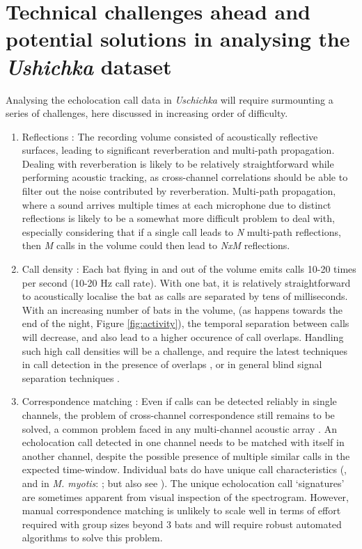 \documentclass[
]{book}
\begin{document}
\hypertarget{technical-challenges-ahead-and-potential-solutions-in-analysing-the-ushichka-dataset}{%
\section{\texorpdfstring{Technical challenges ahead and potential solutions in analysing the \emph{Ushichka} dataset}{Technical challenges ahead and potential solutions in analysing the Ushichka dataset}}\label{technical-challenges-ahead-and-potential-solutions-in-analysing-the-ushichka-dataset}}

Analysing the echolocation call data in \emph{Uschichka} will require surmounting a series of challenges, here discussed in increasing order of difficulty.

\begin{enumerate}
\def\labelenumi{\arabic{enumi})}
\item
  Reflections : The recording volume consisted of acoustically reflective surfaces, leading to significant reverberation and multi-path propagation. Dealing with reverberation is likely to be relatively straightforward while performing acoustic tracking, as cross-channel correlations should be able to filter out the noise contributed by reverberation. Multi-path propagation, where a sound arrives multiple times at each microphone due to distinct reflections is likely to be a somewhat more difficult problem to deal with, especially considering that if a single call leads to \emph{N} multi-path reflections, then \emph{M} calls in the volume could then lead to \emph{NxM} reflections.
\item
  Call density : Each bat flying in and out of the volume emits calls 10-20 times per second (10-20 Hz call rate). With one bat, it is relatively straightforward to acoustically localise the bat as calls are separated by tens of milliseconds. With an increasing number of bats in the volume, (as happens towards the end of the night, Figure \ref{fig:activity}), the temporal separation between calls will decrease, and also lead to a higher occurence of call overlaps. Handling such high call densities will be a challenge, and require the latest techniques in call detection in the presence of overlaps \citep{izadi2020separation}, or in general blind signal separation techniques \citep{brandstein2013microphone}.
\item
  Correspondence matching : Even if calls can be detected reliably in single channels, the problem of cross-channel correspondence still remains to be solved, a common problem faced in any multi-channel acoustic array \citep{brandstein2013microphone}. An echolocation call detected in one channel needs to be matched with itself in another channel, despite the possible presence of multiple similar calls in the expected time-window. Individual bats do have unique call characteristics (\citet{masters1995sonar}, and in \emph{M. myotis}: \citet{yovel2009voice}; but also see \citet{siemersnovoice}). The unique echolocation call `signatures' are sometimes apparent from visual inspection of the spectrogram. However, manual correspondence matching is unlikely to scale well in terms of effort required with group sizes beyond 3 bats and will require robust automated algorithms to solve this problem.

\end{enumerate}
\end{document}
